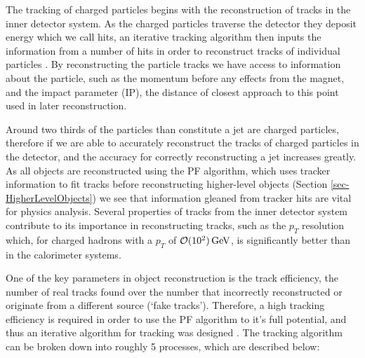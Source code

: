 The tracking of charged particles begins with the reconstruction of tracks in the inner detector system. As the charged particles traverse the detector they deposit energy which we call hits, an iterative tracking algorithm then inputs the information from a number of hits in order to reconstruct tracks of individual particles \cite{1748-0221-9-10-P10009}. By reconstructing the particle tracks we have access to information about the particle, such as the momentum before any effects from the magnet, and the impact parameter (IP), the distance of closest approach to this point used in later reconstruction. 

Around two thirds of the particles than constitute a jet are charged particles, therefore if we are able to accurately reconstruct the tracks of charged particles in the detector, and the accuracy for correctly reconstructing a jet increases greatly. As all objects are reconstructed using the PF algorithm, which uses tracker information to fit tracks before reconstructing higher-level objects (Section \ref{sec-HigherLevelObjects}) we see that information gleaned from tracker hits are vital for physics analysis. Several properties of tracks from the inner detector system contribute to its importance in reconstructing tracks, such as the $p_T$ resolution which, for charged hadrons with a $p_T$ of $\mathcal{O}(10^2) \,\text{Ge\hspace{-.08em}V}$, is significantly better than in the calorimeter systems.

One of the key parameters in object reconstruction is the track efficiency, the number of real tracks found over the number that incorrectly reconstructed or originate from a different source (`fake tracks'). Therefore, a high tracking efficiency is required in order to use the PF algorithm to it's full potential, and thus an iterative algorithm for tracking was designed \cite{1748-0221-9-10-P10009}. The tracking algorithm can be broken down into roughly 5 processes, which are described below:

